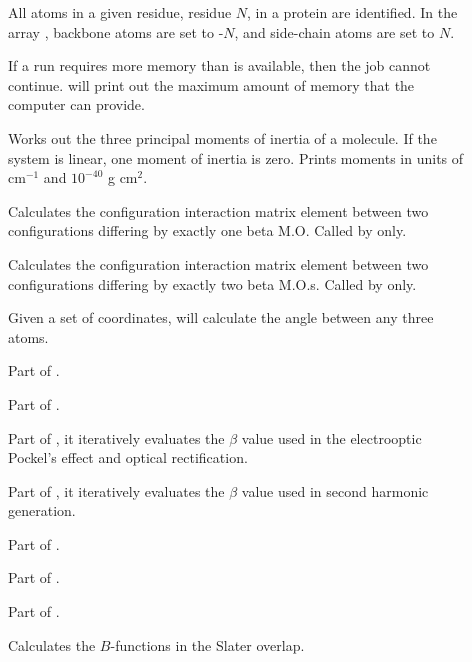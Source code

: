\begin{description}
\item[] All atoms in a given residue, residue $N$, in a protein
are identified.  In the array , backbone atoms are set to -$N$, and
side-chain atoms are set to $N$.

\item[] If a run requires more memory than is available, then the
job cannot continue.   will print out the maximum amount of memory
that the computer can provide.

\item[] Works out the three principal moments of inertia of a
molecule. If the system is linear, one moment of inertia is zero. Prints
moments in units of cm$^{-1}$ and $10^{-40}$ g cm$^2$.

\item[] Calculates the configuration interaction matrix element
between two configurations differing by exactly one beta M.O.  Called by
 only.

\item[] Calculates the configuration interaction matrix element
between two configurations differing by exactly two beta M.O.s. Called by
 only.

\item[] Given a set of coordinates,  will calculate
the angle between any three atoms.

\item[] Part of . 

\item[] Part of . 

\item[] Part of , it iteratively evaluates the 
$\beta$ value used in the electrooptic Pockel's effect and optical
rectification.

\item[] Part of , it iteratively evaluates  the $\beta$
value used in second harmonic generation.

\item[]  Part of . 

\item[] Part of . 

\item[] Part of .

\item[] Calculates the $B$-functions in the Slater overlap.


\end{description}
